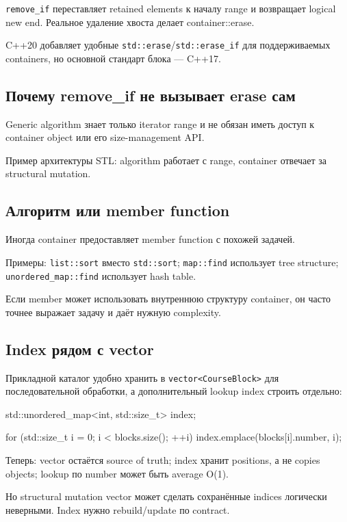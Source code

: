 \texttt{remove\_if} переставляет retained elements к началу range и возвращает
logical new end. Реальное удаление хвоста делает container::erase.

C++20 добавляет удобные \texttt{std::erase}/\texttt{std::erase\_if} для
поддерживаемых containers, но основной стандарт блока --- C++17.

\subsection{Почему remove\_if не вызывает erase сам}

Generic algorithm знает только iterator range и не обязан иметь доступ к
container object или его size-management API.

Пример архитектуры STL:
algorithm работает с range, container отвечает за structural mutation.

\subsection{Алгоритм или member function}

Иногда container предоставляет member function с похожей задачей.

Примеры:
\texttt{list::sort} вместо \texttt{std::sort}; \texttt{map::find} использует tree structure; \texttt{unordered\_map::find} использует hash table.

Если member может использовать внутреннюю структуру container, он часто точнее
выражает задачу и даёт нужную complexity.

\subsection{Index рядом с vector}

Прикладной каталог удобно хранить в \texttt{vector<CourseBlock>} для
последовательной обработки, а дополнительный lookup index строить отдельно:

\begin{cppcode}
std::unordered_map<int, std::size_t> index;

for (std::size_t i = 0; i < blocks.size(); ++i) {
    index.emplace(blocks[i].number, i);
}
\end{cppcode}

Теперь:
vector остаётся source of truth; index хранит positions, а не copies objects; lookup по number может быть average O(1).

Но structural mutation vector может сделать сохранённые indices логически
неверными. Index нужно rebuild/update по contract.

